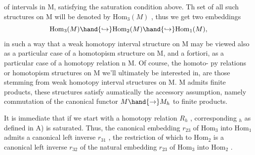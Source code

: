  of intervals in M, satisfying the saturation condition above. Th
 set of all such structures on M will be denoted by $\mathrm{Hom}_3(M)$ , thus
we get two embeddings
\[ \mathrm{Hom}_3(M)\hand{\ensuremath{\hookrightarrow}}\mathrm{Hom}_2(M)\hand{\ensuremath{\hookrightarrow}}\mathrm{Hom}_1(M), \]
in such a way that a weak homotopy interval structure on M may be viewed
also as a particular case of a homotopism structure on M, and a fortiori,
as a particular case of a homotopy relation n M. Of course, the homoto-%
py relations or homotopism structures on M we'll ultimately be interested
in, are those stemming from weak homotopy interval structures on M. 
 M admits finite products,  these structures satisfy aumatically the
accessory assumption, namely commutation of the canonical functor $M\hand{\ensuremath{\to}}M_h$
to finite products.

It is immediate that if we start with a homotopy relation $R_h$ , 
corresponding \hand{$\Sigma$}$_h$ as defined in A) is saturated. Thus, the canonical
embedding $r_{23}$ of $\mathrm{Hom}_3$ into $\mathrm{Hom}_1$ admits a canonical left inverse $r_{31}$ ,
the restriction of which to $\mathrm{Hom}_2$ is a canonical left inverse $r_{32}$ of the
natural embedding $r_{23}$ of $\mathrm{Hom}_3$ into $\mathrm{Hom}_2$ .

